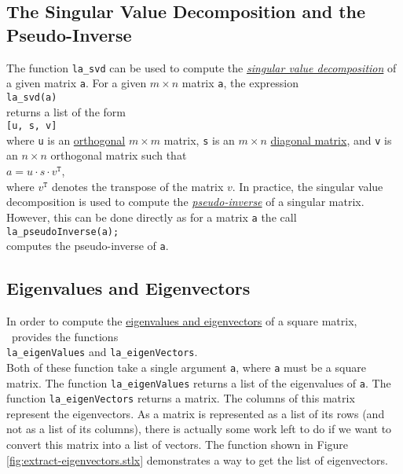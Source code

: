 \subsection{The Singular Value Decomposition and the Pseudo-Inverse}
The function \texttt{la\_svd} can be used to compute the 
\href{http://en.wikipedia.org/wiki/Singular_value_decomposition}{\emph{singular value decomposition}} 
of a given matrix \texttt{a}.  For a given $m \times n$ matrix \texttt{a}, the expression 
\\[0.2cm]
\hspace*{1.3cm}
\texttt{la\_svd(a)}
\\[0.2cm]
returns a list of the form
\\[0.2cm]
\hspace*{1.3cm}
\texttt{[u, s, v]}
\\[0.2cm]
where \texttt{u} is an 
\href{http://en.wikipedia.org/wiki/Orthogonal_matrix}{orthogonal} $m \times m$ matrix, \texttt{s}
is an $m \times n$ 
\href{http://en.wikipedia.org/wiki/Diagonal_matrix}{diagonal matrix}, and \texttt{v} is an $n \times n$
orthogonal matrix such that
\\[0.2cm]
\hspace*{1.3cm}
$a = u \cdot s \cdot v^{\mathtt{T}}$,
\\[0.2cm]
where $v^{\mathtt{T}}$ denotes the transpose of the matrix $v$.
  In practice, the singular value decomposition is used to compute the
\href{http://en.wikipedia.org/wiki/Moore-Penrose_pseudoinverse}{\emph{pseudo-inverse}}
 of a singular matrix.   However, this can be done directly as for a matrix \texttt{a} the call
\\[0.2cm]
\hspace*{1.3cm}
\texttt{la\_pseudoInverse(a);}
\\[0.2cm]
computes the pseudo-inverse of \texttt{a}.

\subsection{Eigenvalues and Eigenvectors}
In order to compute the 
\href{http://en.wikipedia.org/wiki/Eigenvalues_and_eigenvectors}{eigenvalues and eigenvectors} of a
square matrix, \setlx\ provides the functions
\\[0.2cm]
\hspace*{1.3cm}
\texttt{la\_eigenValues} \quad and \quad \texttt{la\_eigenVectors}.
\\[0.2cm]
Both of these function take a single argument \texttt{a}, where \texttt{a} must be a square matrix.
The function \texttt{la\_eigenValues} returns a list of the eigenvalues of \texttt{a}.  The
function \texttt{la\_eigenVectors} returns a matrix.  The columns of this matrix represent the
eigenvectors.  As a matrix is represented as a list of its rows (and not as a list of its columns),
there is actually some work left to do if we want to convert this matrix into a list of vectors.
The function shown in Figure \ref{fig:extract-eigenvectors.stlx} demonstrates a way to get the list of
eigenvectors. 

